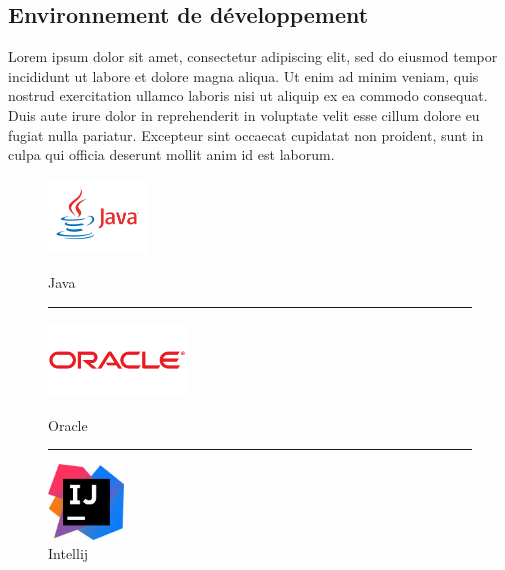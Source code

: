 \documentclass[a4paper, 12pt]{report}
\begin{document}
\subsection{Environnement de développement}

Lorem ipsum dolor sit amet, consectetur adipiscing elit, sed do eiusmod tempor incididunt ut labore et dolore magna aliqua. Ut enim ad minim veniam, quis nostrud exercitation ullamco laboris nisi ut aliquip ex ea commodo consequat. Duis aute irure dolor in reprehenderit in voluptate velit esse cillum dolore eu fugiat nulla pariatur. Excepteur sint occaecat cupidatat non proident, sunt in culpa qui officia deserunt mollit anim id est laborum.

\begin{figure}
  \begin{center}
    \begin{minipage}{4cm}
      \begin{center}
        \includegraphics[height=2cm]{../res/java.jpg}
        \caption{Java}
      \end{center}
    \end{minipage}
    \rule{1cm}{0cm}
    \begin{minipage}{4cm}
      \begin{center}
        \includegraphics[height=2cm]{../res/oracle.png}
        \caption{Oracle}
      \end{center}
    \end{minipage}
    \rule{1cm}{0cm}
    \begin{minipage}{4cm}
      \begin{center}
        \includegraphics[height=2cm]{../res/intellij.jpg}
        \caption{Intellij}
      \end{center}
    \end{minipage}
  \end{center}
\end{figure}
\end{document}
